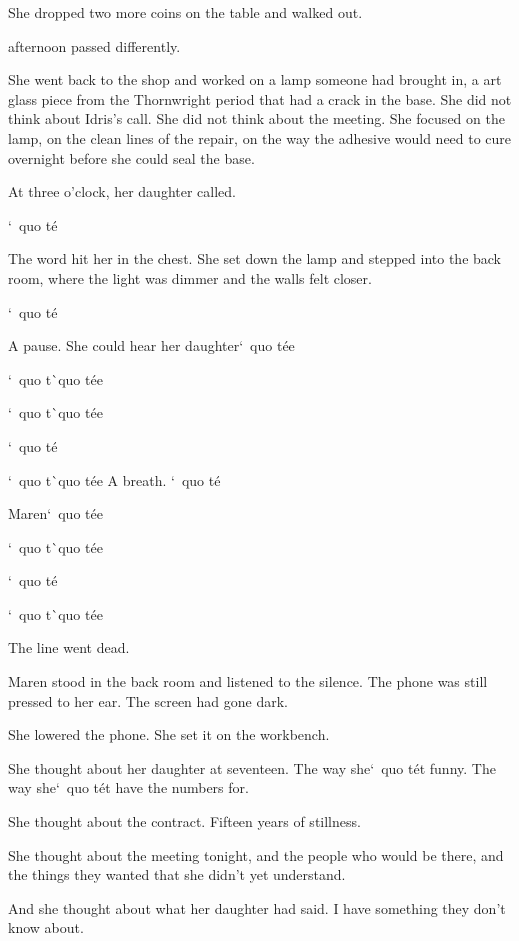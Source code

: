 \documentclass[12pt,letterpaper,openany]{book}
\begin{document}
\par
She dropped two more coins on the table and walked out.
\par
\hrulefillThe afternoon passed differently.
\par
She went back to the shop and worked on a lamp someone had brought in, a art glass piece from the Thornwright period that had a crack in the base. She did not think about Idris's call. She did not think about the meeting. She focused on the lamp, on the clean lines of the repair, on the way the adhesive would need to cure overnight before she could seal the base.
\par
At three o'clock, her daughter called.
\par
`\ quo t\'e{}
\par
The word hit her in the chest. She set down the lamp and stepped into the back room, where the light was dimmer and the walls felt closer.
\par
`\ quo t\'e{}
\par
A pause. She could hear her daughter`\ quo t\'e{}e{}
\par
`\ quo t\`\ quo t\'e{}e{}
\par
`\ quo t\`\ quo t\'e{}e{}
\par
`\ quo t\'e{}
\par
`\ quo t\`\ quo t\'e{}e{} A breath. `\ quo t\'e{}
\par
Maren`\ quo t\'e{}e{}
\par
`\ quo t\`\ quo t\'e{}e{}
\par
`\ quo t\'e{}
\par
`\ quo t\`\ quo t\'e{}e{}
\par
The line went dead.
\par
Maren stood in the back room and listened to the silence. The phone was still pressed to her ear. The screen had gone dark.
\par
She lowered the phone. She set it on the workbench.
\par
She thought about her daughter at seventeen. The way she`\ quo t\'e{}t funny. The way she`\ quo t\'e{}t have the numbers for.
\par
She thought about the contract. Fifteen years of stillness.
\par
She thought about the meeting tonight, and the people who would be there, and the things they wanted that she didn't yet understand.
\par
And she thought about what her daughter had said. I have something they don't know about.
\par
\end{document}
